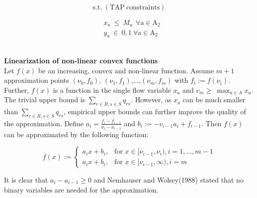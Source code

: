 \documentclass[a4paper, 12pt]{article}
\begin{document}
\indent\boldmath\begin{large}
\begin{equation*}
\mathrm{s.t.}\ \mathrm{\left(TAP\ constraints\right)}
\end{equation*}
\end{large}
\begin{large}
\begin{align*}
& x_{a}\ \leq\ M_{a}\ \ \mathrm{\forall{a}\in{A_{2}}} \\
& y_{a}\ \in\ {0,1}\ \mathrm{\forall{a}\in{A_{2}}}
\end{align*} %
\end{large} \\
\textbf{Linearization of non-linear convex functions}\\
Let $f\left(x\right)$ be an increasing, convex and non-linear function. Assume $m+1$ approximation points $\left(\nu_{0},f_{0}\right)$, $\left(\nu_{1},f_{1}\right)$,...,$\left(\nu_{m},f_{m}\right)$ with $f_{i}:=f\left(\nu_{i}\right)$. Further, $f\left(x\right)$ is a function in the single flow variable $x_{a}$ and $v_{m}\geq\ \max_{a\in{A}}{x_{a}}$. The trivial upper bound is $\sum_{r\in{R},s\in{S}} q_{rs}$. However, as $x_{a}$ can be much smaller than $\sum_{r\in{R},s\in{S}} q_{rs}$, empirical upper bounds can further improve the quality of the approximation. Define $a_{i}=\frac{f_{i}-f_{i-1}}{\nu_{i}-\nu_{i-1}}$ and $b_{i}:=-v_{i-1}a_{i}+f_{i-1}$. Then $f\left(x\right)$ can be approximated by the following function:
\begin{large}
\[
 \overline{f}(x) := 
  \begin{cases} 
   a_{i}x+b_{i}, & \text{for }  x \in{[\nu_{i-1},\nu_{i})},i=1,...,m-1  \\
   a_{i}x+b_{i}, & \text{for }  x \in{[\nu_{i-1},\infty)},i=m
  \end{cases}
\]
\end{large}
It is clear that $a_{i}-a_{i-1}\geq0$ and Nemhauser and Wolsey(1988) stated that no binary variables are needed for the approximation.\\
\end{document}
